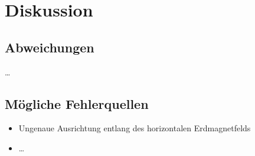 \section{Diskussion}
\label{sec:diskussion}

\subsection{Abweichungen}

…


\subsection{Mögliche Fehlerquellen}

\begin{itemize}
    \item Ungenaue Ausrichtung entlang des horizontalen Erdmagnetfelds
    \item …
\end{itemize}
